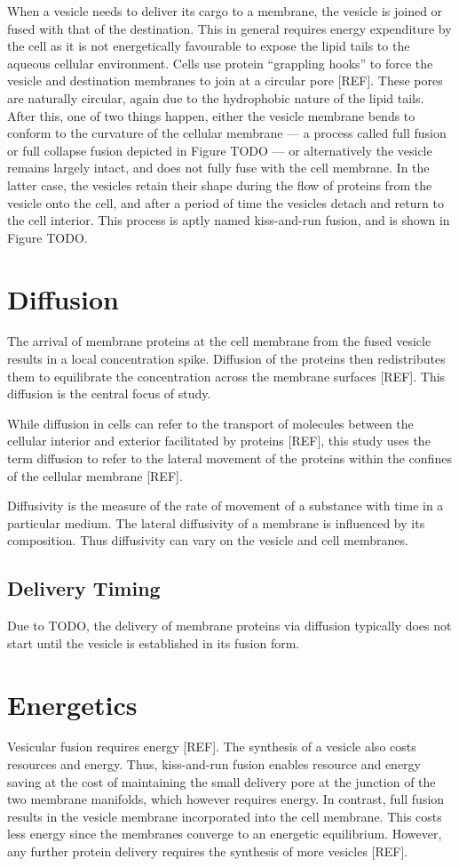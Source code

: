 \documentclass{report}
\begin{document}
When a vesicle needs to deliver its cargo to a membrane, the vesicle is joined or fused with that of the destination. This in general requires energy expenditure by the cell as it is not energetically favourable to expose the lipid tails to the aqueous cellular environment. Cells use protein ``grappling hooks'' to force the vesicle and destination membranes to join at a circular pore [REF]. These pores are naturally circular, again due to the hydrophobic nature of the lipid tails. After this, one of two things happen, either the vesicle membrane bends to conform to the curvature of the cellular membrane --- a process called full fusion or full collapse fusion depicted in Figure TODO --- or alternatively the vesicle remains largely intact, and does not fully fuse with the cell membrane. In the latter case, the vesicles retain their shape during the flow of proteins from the vesicle onto the cell, and after a period of time the vesicles detach and return to the cell interior. This process is aptly named kiss-and-run fusion, and is shown in Figure TODO.

\section{Diffusion}
The arrival of membrane proteins at the cell membrane from the fused vesicle results in a local concentration spike. Diffusion of the proteins then redistributes them to equilibrate the concentration across the membrane surfaces [REF]. This diffusion is the central focus of study.

While diffusion in cells can refer to the transport of molecules between the cellular interior and exterior facilitated by proteins [REF], this study uses the term diffusion to refer to the lateral movement of the proteins within the confines of the cellular membrane [REF].

Diffusivity is the measure of the rate of movement of a substance with time in a particular medium. The lateral diffusivity of a membrane is influenced by its composition. Thus diffusivity can vary on the vesicle and cell membranes.

\subsection{Delivery Timing}
Due to TODO, the delivery of membrane proteins via diffusion typically does not start until the vesicle is established in its fusion form.

\section{Energetics}
Vesicular fusion requires energy [REF]. The synthesis of a vesicle also costs resources and energy. Thus, kiss-and-run fusion enables resource and energy saving at the cost of maintaining the small delivery pore at the junction of the two membrane manifolds, which however requires energy. In contrast, full fusion results in the vesicle membrane incorporated into the cell membrane. This costs less energy since the membranes converge to an energetic equilibrium. However, any further protein delivery requires the synthesis of more vesicles [REF].
\end{document}
